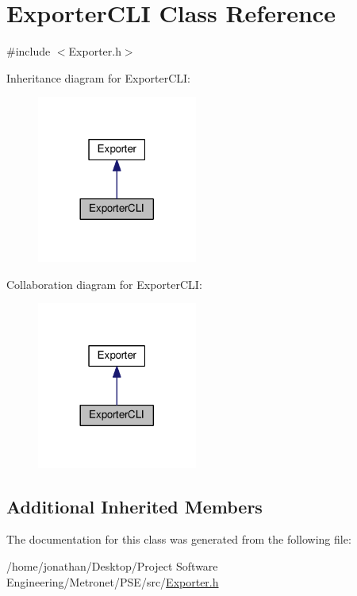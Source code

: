 \hypertarget{class_exporter_c_l_i}{}\section{Exporter\+C\+LI Class Reference}
\label{class_exporter_c_l_i}


{\ttfamily \#include $<$Exporter.\+h$>$}



Inheritance diagram for Exporter\+C\+LI\+:
\nopagebreak
\begin{figure}[H]
\begin{center}
\leavevmode
\includegraphics[width=149pt]{class_exporter_c_l_i__inherit__graph}
\end{center}
\end{figure}


Collaboration diagram for Exporter\+C\+LI\+:
\nopagebreak
\begin{figure}[H]
\begin{center}
\leavevmode
\includegraphics[width=149pt]{class_exporter_c_l_i__coll__graph}
\end{center}
\end{figure}
\subsection*{Additional Inherited Members}


The documentation for this class was generated from the following file\+:\begin{DoxyCompactItemize}
\item 
/home/jonathan/\+Desktop/\+Project Software Engineering/\+Metronet/\+P\+S\+E/src/\hyperlink{_exporter_8h}{Exporter.\+h}\end{DoxyCompactItemize}

